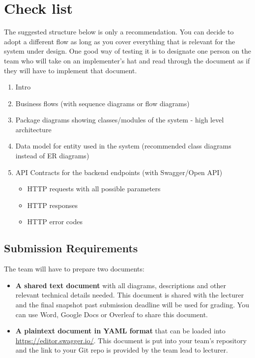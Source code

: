 \documentclass[]{VUMIFTemplateClass}
\begin{document}

\onehalfspacing


\tableofcontents
\onehalfspacing


\section*{Check list \checkmark}

The suggested structure below is only a recommendation. You can decide to adopt a different flow as long as you cover everything that is relevant for the system under design. One good way of testing it is to designate one person on the team who will take on an implementer's hat and read through the document as if they will have to implement that document.

\begin{enumerate}
    \item Intro
    \item Business flows (with sequence diagrams or flow diagrams)
    \item Package diagrams showing classes/modules of the system - high level architecture
    \item Data model for entity used in the system (recommended class diagrams instead of ER diagrams)
    \item API Contracts for the backend endpoints (with Swagger/Open API)
    \begin{itemize}
        \item HTTP requests with all possible parameters
        \item HTTP responses
        \item HTTP error codes
    \end{itemize}
\end{enumerate}

\subsection*{Submission Requirements}

The team will have to prepare two documents:

\begin{itemize}
    \item \textbf{A shared text document} with all diagrams, descriptions and other relevant technical details needed. This document is shared with the lecturer and the final snapshot past submission deadline will be used for grading. You can use Word, Google Docs or Overleaf to share this document.
    
    \item \textbf{A plaintext document in YAML format} that can be loaded into \href{https://editor.swagger.io/}{https://editor.swagger.io/}. This document is put into your team's repository and the link to your Git repo is provided by the team lead to lecturer.
\end{itemize}
\end{document}
